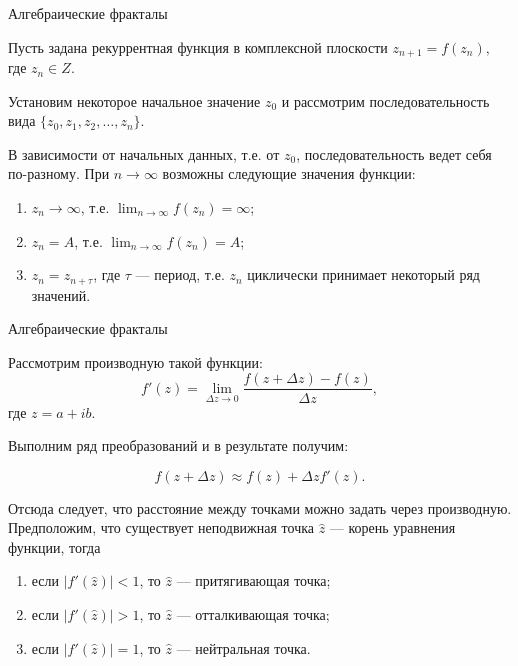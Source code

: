 \documentclass{beamer}
\begin{document}
\begin{frame}{Алгебраические фракталы}

	Пусть задана рекуррентная функция в комплексной плоскости
	$z_{n+1} = f(z_n),$ где $z_n \in Z$.

	Установим некоторое начальное значение $z_0$ и рассмотрим последовательность вида $\{z_0, z_1, z_2, \dots , z_n \}$.

	В зависимости от начальных данных, т.е. от $z_0$, последовательность ведет себя по-разному. При $n \to \infty$ возможны следующие значения функции:
	\begin{enumerate}
		\item $z_n \to \infty$, т.е. $\lim_{n \to \infty} f(z_n) = \infty$;
		\item $z_n = A$, т.е. $\lim_{n \to \infty} f(z_n) = A$;
		\item $z_n = z_{n+ \tau}$, где  $\tau$ --- период, т.е. $z_n$ циклически принимает некоторый ряд значений.
	\end{enumerate}

\end{frame}

\begin{frame}{Алгебраические фракталы}

	Рассмотрим производную такой функции:
	\[
		f'(z) = \lim_{\Delta z \to 0} \frac{f(z + \Delta z)-f(z)}{\Delta z}
		,
	\]
	где
	$z = a+ib$.

	Выполним ряд преобразований и в результате получим:

	\[
		f(z + \Delta z) \approx f(z) + \Delta z f'(z)
		.
	\]

	Отсюда следует, что расстояние между точками можно задать через производную.
	Предположим, что существует неподвижная точка $\hat{z}$ --- корень уравнения функции, тогда
	\begin{enumerate}
		\item если $|f' (\hat{z}) | < 1$, то $\hat{z}$ --- притягивающая точка;
		\item если $|f'(\hat{z})| > 1$, то $\hat{z}$ --- отталкивающая точка;
		\item если $|f'(\hat{z})| = 1$, то $\hat{z}$ --- нейтральная точка.
	\end{enumerate}


\end{frame}
\end{document}

